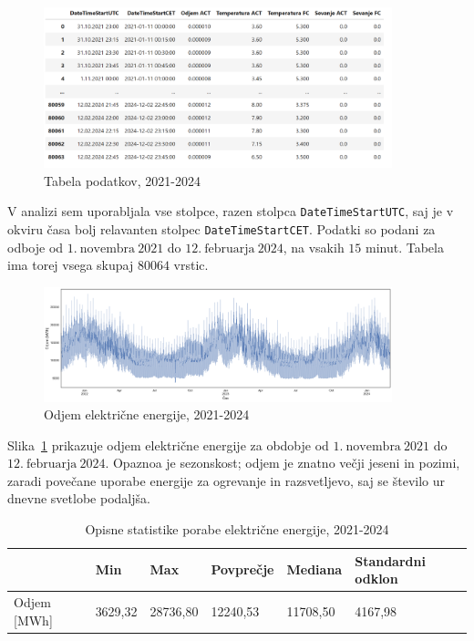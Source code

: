 \documentclass[a4paper, 11pt]{article}
\begin{document}
\begin{figure}[h!]
    \centering
    \caption{Tabela podatkov, 2021-2024}\par\medskip
    \includegraphics[width=0.9\textwidth]{tabela.png}
\end{figure}

\noindent V analizi sem uporabljala vse stolpce, razen stolpca \texttt{DateTimeStartUTC}, saj je v 
okviru časa bolj relavanten stolpec \texttt{DateTimeStartCET}. Podatki so podani za odboje od $1.~\text{novembra}~2021$ do $12.~\text{februarja}~2024$,
na vsakih $15$ minut. Tabela ima torej vsega skupaj $80064$ vrstic.

\begin{figure}[h!]
    \centering
    \caption{Odjem električne energije, 2021-2024}\par\medskip
    \label{fig:odjem_EE}
    \includegraphics[width=0.9\textwidth]{odjem_EE.png}
\end{figure}

\noindent Slika~\ref{fig:odjem_EE} prikazuje odjem električne energije za obdobje od 
$1.~\text{novembra}~2021$ do $12.~\text{februarja}~2024$. 
Opaznoa je sezonskost; odjem je znatno večji jeseni in pozimi, zaradi povečane uporabe energije za ogrevanje in 
razsvetljevo, saj se število ur dnevne svetlobe podaljša. 

\begin{table}[!h]
    \centering
    \caption{Opisne statistike porabe električne energije, 2021-2024}\par\medskip
    \label{Tab:opisne_statistike}
    \begin{tabular}{l||l|l|l|l|l}
              & Min & Max & Povprečje & Mediana & Standardni odklon \\ \hline \hline
        Odjem [MWh] & 3629,32 & 28736,80 & 12240,53 & 11708,50 & 4167,98 \\ 
    \end{tabular}
\end{table}
\end{document}
